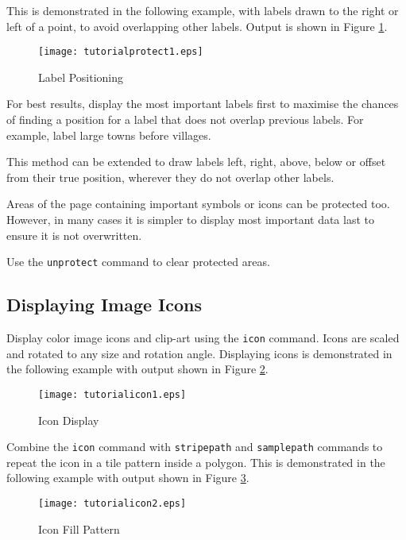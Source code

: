 This is demonstrated in the following example, with labels
drawn to the right or left of a point, to avoid overlapping
other labels.
Output is shown in Figure \ref{tutorialprotect1}.



\begin{figure}[htb]
\texttt{[image: tutorialprotect1.eps]}
\caption{Label Positioning}
\label{tutorialprotect1}
\end{figure}

For best results, display the most important labels first to maximise the
chances of finding a position for a label that does not overlap previous
labels.  For example, label large towns before villages.

This method can be extended to draw labels left, right, above, below or offset
from their true position, wherever they do not overlap other labels.

Areas of the page containing important symbols or icons can be
protected too.  However, in many cases it is simpler to
display most important data last to ensure it is not overwritten.

Use the \texttt{unprotect} command to clear protected areas.

\subsection{Displaying Image Icons}
\label{icons}

Display color image icons and clip-art using the \texttt{icon} command.
Icons are scaled and rotated to any size and rotation angle.
Displaying icons is demonstrated in the following example
with output shown in Figure \ref{tutorialicon1}.



\begin{figure}[htb]
\texttt{[image: tutorialicon1.eps]}
\caption{Icon Display}
\label{tutorialicon1}
\end{figure}

Combine the \texttt{icon} command with
\texttt{stripepath} and
\texttt{samplepath} commands to
repeat the icon in a tile pattern inside a polygon.
This is demonstrated in the following example
with output shown in Figure \ref{tutorialicon2}.



\begin{figure}[htb]
\texttt{[image: tutorialicon2.eps]}
\caption{Icon Fill Pattern}
\label{tutorialicon2}
\end{figure}

